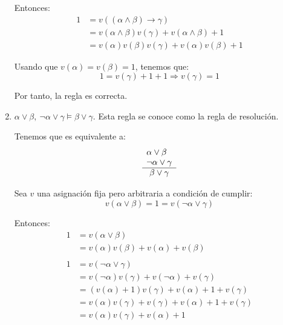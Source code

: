 \begin{ejercicio*}
\begin{enumerate}
        Entonces:
        \begin{align*}
            1 &= v((\alpha\land\beta)\rightarrow\gamma) \\
            &= v(\alpha\land\beta)v(\gamma)+v(\alpha\land\beta)+1\\
            &= v(\alpha)v(\beta)v(\gamma)+v(\alpha)v(\beta)+1
        \end{align*}

        Usando que $v(\alpha)=v(\beta)=1$, tenemos que:
        \begin{equation*}
            1 = v(\gamma)+1+1 \Longrightarrow v(\gamma)=1
        \end{equation*}

        Por tanto, la regla es correcta.

        \item $\alpha\lor\beta,~\lnot\alpha\lor \gamma\models \beta\lor\gamma$. Esta regla se conoce como la regla de resolución.

        Tenemos que es equivalente a:
        \begin{equation*}
            \begin{array}{l}
                \alpha\lor\beta\\
                \lnot\alpha\lor\gamma\\ \hline
                \multicolumn{1}{c}{\beta\lor\gamma}
            \end{array}
        \end{equation*}

        Sea $v$ una asignación fija pero arbitraria a condición de cumplir:
        \begin{equation*}
            v(\alpha\lor\beta)=1=v(\lnot\alpha\lor\gamma)
        \end{equation*}

        Entonces:
        \begin{align*}
            1 &= v(\alpha\lor\beta) \\
            &= v(\alpha)v(\beta)+v(\alpha)+v(\beta)\\ \\
            1 &= v(\lnot\alpha\lor\gamma) \\
            &= v(\lnot \alpha)v(\gamma)+v(\lnot \alpha)+v(\gamma)\\
            &= (v(\alpha)+1)v(\gamma)+v(\alpha)+1+v(\gamma)\\
            &= v(\alpha)v(\gamma)+v(\gamma)+v(\alpha)+1+v(\gamma)\\
            &= v(\alpha)v(\gamma)+v(\alpha)+1
        \end{align*}


\end{enumerate}
\end{ejercicio*}
